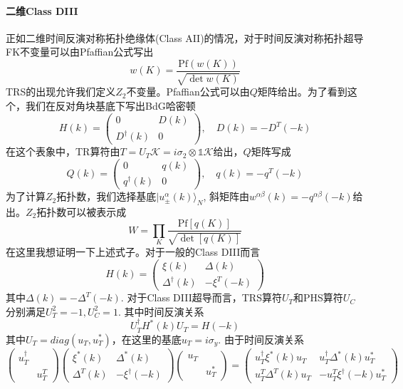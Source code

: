 \documentclass[a4paper]{article}
\numberwithin{equation}{subsection}
\begin{document}
\paragraph{二维Class DIII}
正如二维时间反演对称拓扑绝缘体(Class AII)的情况，对于时间反演对称拓扑超导FK不变量可以由Pfaffian公式写出
\begin{equation}
    w(K)=\frac{\mathrm{Pf}(w(K))}{\sqrt{\det w(K)}}
\end{equation}
TRS的出现允许我们定义$Z_2$不变量。Pfaffian公式可以由$Q$矩阵给出。为了看到这个，我们在反对角块基底下写出BdG哈密顿
\begin{equation}
    H(k)=\begin{pmatrix}
        0&D(k)\\
        D^\dagger(k)&0
    \end{pmatrix},\quad D(k)=-D^T(-k)
\end{equation}
在这个表象中，TR算符由$T=U_T\mathcal{K}=i\sigma_2\otimes\mathbb{1}\mathcal{K}$给出，$Q$矩阵写成
\begin{equation}
    Q(k)=\begin{pmatrix}
        0&q(k)\\
        q^\dagger(k)&0
    \end{pmatrix},\quad q(k)=-q^T(-k)
\end{equation}
为了计算$Z_2$拓扑数，我们选择基底$|u_\pm^\alpha(k)\rangle_N$, 斜矩阵由$w^{\alpha\beta}(k)=-q^{\alpha\beta}(-k)$给出。$Z_2$拓扑数可以被表示成
\begin{equation}
    W=\prod_{K}\frac{\mathrm{Pf}[q(K)]}{\sqrt{\det[q(K)]}}
\end{equation}
在这里我想证明一下上述式子。对于一般的Class DIII而言
\begin{equation}
    H(k)=\begin{pmatrix}
        \xi(k)&\Delta(k)\\
        \Delta^\dagger(k)&-\xi^T(-k)
    \end{pmatrix}
\end{equation}
其中$\Delta(k)=-\Delta^T(-k)$. 对于Class DIII超导而言，TRS算符$U_T$和PHS算符$U_C$分别满足$U_T^2=-1,U_C^2=1$. 其中时间反演关系
\begin{equation}
    U_T^\dagger H^*(k)U_T=H(-k)
\end{equation}
其中$U_T=diag(u_T,u_T^*)$，在这里的基底$u_T=i\sigma_y$. 由于时间反演关系
\begin{equation}
    \begin{pmatrix}
        u_T^\dagger\\
        &u_T^T
    \end{pmatrix}\begin{pmatrix}
        \xi^*(k)&\Delta^*(k)\\
        \Delta^T(k)&-\xi^\dagger(-k)
    \end{pmatrix}\begin{pmatrix}
        u_T&\\
        &u_T^*
    \end{pmatrix}=\begin{pmatrix}
        u_T^\dagger\xi^*(k)u_T&u_T^\dagger\Delta^*(k)u_T^*\\
        u_T^T\Delta^T(k)u_T&-u_T^T\xi^\dagger(-k)u_T^*
    \end{pmatrix}
\end{equation}
\end{document}
